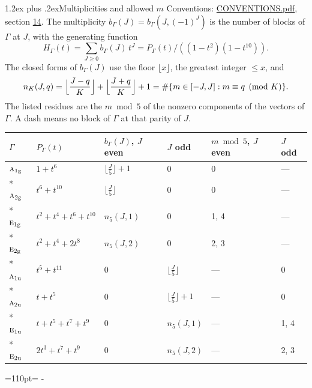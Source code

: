 \documentclass[10pt,a4paper]{article}
\makeatletter
\renewcommand\section{\@startsection{section}{1}{\z@}{-3ex plus -1ex minus -.2ex}%
  {1.2ex plus .2ex}{\normalfont\large\sffamily\bfseries\color{parttitle}}}
\newcommand{\needspace}[1]{\par\penalty-100\begingroup\dimen0=#1\relax\dimen2=\pagegoal
  \advance\dimen2-\pagetotal\ifdim\dimen0>\dimen2\relax\ifdim\dimen2>0pt\vfil\break\fi\fi
  \endgroup}
\numberwithin{equation}{section}
\newcommand{\irr}[1]{\text{\normalfont\scshape #1}}
\newcommand{\ptag}[1]{\mathrm{#1}}
\makeatother
\begin{document}
\section{Multiplicities and allowed \texorpdfstring{$m$}{m}}\label{s:multiplicities}
Conventions: \href{../../CONVENTIONS.pdf}{CONVENTIONS.pdf}, section \href{../../CONVENTIONS.pdf\#conv.14}{14}.
\leavevmode\label{n:function.generating}\label{n:index.generating.variable}\label{n:function.generating.numerator}The multiplicity $b_\Gamma(J) = b_\Gamma(J, (-1)^J)$ is the number of blocks of $\Gamma$ at $J$, with the generating function
\begin{equation}\label{e:gf}H_\Gamma(t) = \sum_{J\ge0} b_\Gamma(J)\,t^J = P_\Gamma(t)/((1-t^{2})(1-t^{10})).\end{equation}
\leavevmode\label{n:delimiter.floor}\label{n:local.floor.x}\label{n:function.count}\label{n:index.modulus.K}\label{n:index.residue}The closed forms of $b_\Gamma(J)$ use the floor $\lfloor x\rfloor$, the greatest integer $\le x$, and
\begin{equation}\label{e:count}n_K(J,q) = \Bigl\lfloor\frac{J-q}{K}\Bigr\rfloor + \Bigl\lfloor\frac{J+q}{K}\Bigr\rfloor + 1 = \#\{m\in[-J,J] : m\equiv q \pmod{K}\}.\end{equation}
\leavevmode\label{n:head.parity}The listed residues are the $m \bmod 5$ of the nonzero components of the vectors of $\Gamma$. A dash means no block of $\Gamma$ at that parity of $J$.
{\small{\renewcommand{\arraystretch}{1.3}\begin{longtable}{@{}llllll@{}}\toprule
$\Gamma$ & $P_\Gamma(t)$ & $b_\Gamma(J)$, $J$ even & $J$ odd & $m \bmod 5$, $J$ even & $J$ odd\\\midrule\endhead
\bottomrule\endfoot\endlastfoot
$\irr{a}_{1\ptag{g}}$ & $1 + t^{6}$ & $\bigl\lfloor\tfrac{J}{5}\bigr\rfloor + 1$ & $0$ & 0 & ---\\*
$\irr{a}_{2\ptag{g}}$ & $t^{6} + t^{10}$ & $\bigl\lfloor\tfrac{J}{5}\bigr\rfloor$ & $0$ & 0 & ---\\*
$\irr{e}_{1\ptag{g}}$ & $t^{2} + t^{4} + t^{6} + t^{10}$ & $n_{5}(J,1)$ & $0$ & 1, 4 & ---\\*
$\irr{e}_{2\ptag{g}}$ & $t^{2} + t^{4} + 2t^{8}$ & $n_{5}(J,2)$ & $0$ & 2, 3 & ---\\*
$\irr{a}_{1\ptag{u}}$ & $t^{5} + t^{11}$ & $0$ & $\bigl\lfloor\tfrac{J}{5}\bigr\rfloor$ & --- & 0\\*
$\irr{a}_{2\ptag{u}}$ & $t + t^{5}$ & $0$ & $\bigl\lfloor\tfrac{J}{5}\bigr\rfloor + 1$ & --- & 0\\*
$\irr{e}_{1\ptag{u}}$ & $t + t^{5} + t^{7} + t^{9}$ & $0$ & $n_{5}(J,1)$ & --- & 1, 4\\*
$\irr{e}_{2\ptag{u}}$ & $2t^{3} + t^{7} + t^{9}$ & $0$ & $n_{5}(J,2)$ & --- & 2, 3\\
\bottomrule\end{longtable}}}
\needspace{110pt}
\end{document}
